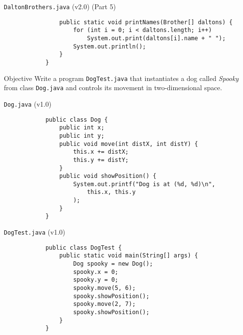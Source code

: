 \documentclass[10pt, compress]{beamer}
\begin{document}
\begin{slide}
	\begin{block}{\texttt{DaltonBrothers.java} (v2.0) (Part 5)}
		\begin{verbatim}
			    public static void printNames(Brother[] daltons) {
			        for (int i = 0; i < daltons.length; i++)
			            System.out.print(daltons[i].name + " ");
			        System.out.println();
			    }
			}
		\end{verbatim}
	\end{block}
\end{slide}

\begin{slide}
	\begin{block}{Objective}
		Write a program \texttt{DogTest.java} that instantiates a dog called \textit{Spooky} from class \texttt{Dog.java} and controls its movement in two-dimensional space.
	\end{block}
\end{slide}

\begin{slide}
	\begin{block}{\texttt{Dog.java} (v1.0)}
		\begin{verbatim}
			public class Dog {
			    public int x;
			    public int y;
			    public void move(int distX, int distY) {
			        this.x += distX;
			        this.y += distY;
			    }
			    public void showPosition() {
			        System.out.printf("Dog is at (%d, %d)\n",
			            this.x, this.y
			        );
			    }
			}
		\end{verbatim}
	\end{block}
\end{slide}

\begin{slide}
	\begin{block}{\texttt{DogTest.java} (v1.0)}
		\begin{verbatim}
			public class DogTest {
			    public static void main(String[] args) {
			        Dog spooky = new Dog();
			        spooky.x = 0;
			        spooky.y = 0;
			        spooky.move(5, 6);
			        spooky.showPosition();
			        spooky.move(2, 7);
			        spooky.showPosition();
			    }
			}
		\end{verbatim}
	\end{block}
\end{slide}

\end{document}
